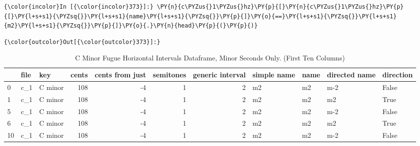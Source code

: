     \begin{Verbatim}[commandchars=\\\{\}]
{\color{incolor}In [{\color{incolor}373}]:} \PY{n}{c\PYZus{}1\PYZus{}hz}\PY{p}{[}\PY{n}{c\PYZus{}1\PYZus{}hz}\PY{p}{[}\PY{l+s+s1}{\PYZsq{}}\PY{l+s+s1}{name}\PY{l+s+s1}{\PYZsq{}}\PY{p}{]}\PY{o}{==}\PY{l+s+s1}{\PYZsq{}}\PY{l+s+s1}{m2}\PY{l+s+s1}{\PYZsq{}}\PY{p}{]}\PY{o}{.}\PY{n}{head}\PY{p}{(}\PY{p}{)}
\end{Verbatim}
\begin{Verbatim}[commandchars=\\\{\}]
{\color{outcolor}Out[{\color{outcolor}373}]:} 
\end{Verbatim}
\begin{singlespace}
\begin{table}[H]
\centering
\tiny
\begin{tabular}{|lllrrrrllll|}
\hline
\textbf{{}} & \textbf{file} & \textbf{     key} & \textbf{ cents} & \textbf{ cents from just} & \textbf{ semitones} & \textbf{ generic interval} & \textbf{simple name} & \textbf{name} & \textbf{directed name} & \textbf{direction }\\
\hline
0  &  c\_1 &  C minor &    108 &               -4 &          1 &                 2 &          m2 &   m2 &           m-2 &     False \\
1  &  c\_1 &  C minor &    108 &               -4 &          1 &                 2 &          m2 &   m2 &            m2 &      True \\
5  &  c\_1 &  C minor &    108 &               -4 &          1 &                 2 &          m2 &   m2 &           m-2 &     False \\
6  &  c\_1 &  C minor &    108 &               -4 &          1 &                 2 &          m2 &   m2 &            m2 &      True \\
10 &  c\_1 &  C minor &    108 &               -4 &          1 &                 2 &          m2 &   m2 &           m-2 &     False \\
\hline
\end{tabular}
\caption[C minor Fugue Horizontal Intervals Dataframe, Minor Seconds Only. ]{C Minor Fugue Horizontal Intervals Dataframe, Minor Seconds Only. (First Ten Columns)}
\end{table}
\normalsize
\end{singlespace}

